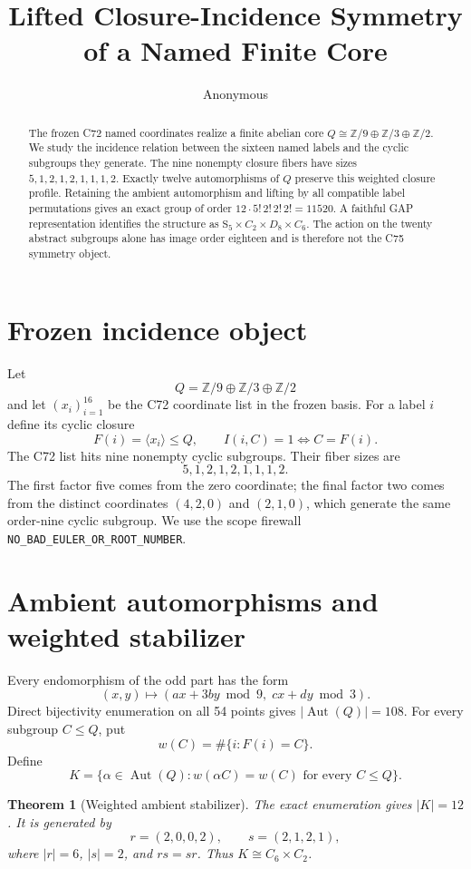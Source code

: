 \documentclass[10pt]{article}
\title{Lifted Closure-Incidence Symmetry of a Named Finite Core}
\author{Anonymous}
\date{}
\newtheorem{theorem}{Theorem}
\newcommand{\Z}{\mathbb Z}
\newcommand{\Aut}{\operatorname{Aut}}
\begin{document}
\maketitle

\begin{abstract}
The frozen C72 named coordinates realize a finite abelian core
$Q\cong\Z/9\oplus\Z/3\oplus\Z/2$.  We study the incidence relation between
the sixteen named labels and the cyclic subgroups they generate.  The nine
nonempty closure fibers have sizes $5,1,2,1,2,1,1,1,2$.  Exactly twelve
automorphisms of $Q$ preserve this weighted closure profile.  Retaining the
ambient automorphism and lifting by all compatible label permutations gives
an exact group of order
$12\cdot5!\,2!\,2!\,2!=11520$.  A faithful GAP representation identifies the
structure as $\mathrm{S}_5\times C_2\times D_8\times C_6$.  The action on
the twenty abstract subgroups alone has image order eighteen and is therefore
not the C75 symmetry object.
\end{abstract}

\section{Frozen incidence object}
Let
\[
 Q=\Z/9\oplus\Z/3\oplus\Z/2
\]
and let $(x_i)_{i=1}^{16}$ be the C72 coordinate list in the frozen basis.
For a label $i$ define its cyclic closure
\[
 F(i)=\langle x_i\rangle\le Q,
 \qquad I(i,C)=1\iff C=F(i).
\]
The C72 list hits nine nonempty cyclic subgroups.  Their fiber sizes are
\[
 5,1,2,1,2,1,1,1,2.
\]
The first factor five comes from the zero coordinate; the final factor two
comes from the distinct coordinates $(4,2,0)$ and $(2,1,0)$, which generate
the same order-nine cyclic subgroup.  We use the scope firewall
\texttt{NO\_BAD\_EULER\_OR\_ROOT\_NUMBER}.

\section{Ambient automorphisms and weighted stabilizer}
Every endomorphism of the odd part has the form
\[
 (x,y)\longmapsto (a x+3 b y\bmod 9,\;c x+d y\bmod 3).
\]
Direct bijectivity enumeration on all 54 points gives $|\Aut(Q)|=108$.
For every subgroup $C\le Q$, put
\[
 w(C)=\#\{i:F(i)=C\}.
\]
Define
\[
 K=\{\alpha\in\Aut(Q):w(\alpha C)=w(C)\text{ for every }C\le Q\}.
\]

\begin{theorem}[Weighted ambient stabilizer]
The exact enumeration gives $|K|=12$.  It is generated by
\[
 r=(2,0,0,2),\qquad s=(2,1,2,1),
\]
where $|r|=6$, $|s|=2$, and $rs=sr$.  Thus $K\cong C_6\times C_2$.
\end{theorem}
\end{document}
